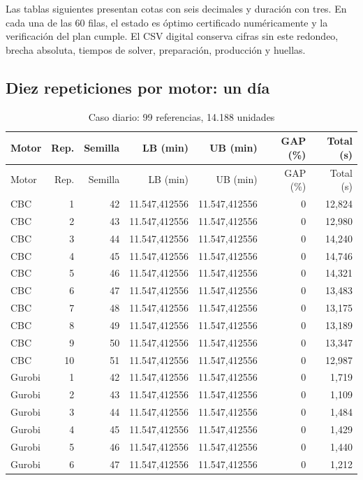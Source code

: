\documentclass[12pt,a4paper,oneside]{article}
\begin{document}
Las tablas siguientes presentan cotas con seis decimales y duración con tres. En cada una de las 60 filas, el estado es óptimo certificado numéricamente y la verificación del plan cumple. El CSV digital conserva cifras sin este redondeo, brecha absoluta, tiempos de solver, preparación, producción y huellas.

\clearpage
\subsection{Diez repeticiones por motor: un día}
{\small\setlength{\tabcolsep}{4pt}
\begin{longtable}{lrrrrrr}
\caption{Caso diario: 99 referencias, 14.188 unidades}\label{tab:60a}\\
\toprule Motor&Rep.&Semilla&LB (min)&UB (min)&GAP (\%)&Total (s)\\\midrule\endfirsthead
\toprule Motor&Rep.&Semilla&LB (min)&UB (min)&GAP (\%)&Total (s)\\\midrule\endhead
\bottomrule\endfoot
CBC & 1 & 42 & 11.547,412556 & 11.547,412556 & 0 & 12,824 \\
CBC & 2 & 43 & 11.547,412556 & 11.547,412556 & 0 & 12,980 \\
CBC & 3 & 44 & 11.547,412556 & 11.547,412556 & 0 & 14,240 \\
CBC & 4 & 45 & 11.547,412556 & 11.547,412556 & 0 & 14,746 \\
CBC & 5 & 46 & 11.547,412556 & 11.547,412556 & 0 & 14,321 \\
CBC & 6 & 47 & 11.547,412556 & 11.547,412556 & 0 & 13,483 \\
CBC & 7 & 48 & 11.547,412556 & 11.547,412556 & 0 & 13,175 \\
CBC & 8 & 49 & 11.547,412556 & 11.547,412556 & 0 & 13,189 \\
CBC & 9 & 50 & 11.547,412556 & 11.547,412556 & 0 & 13,347 \\
CBC & 10 & 51 & 11.547,412556 & 11.547,412556 & 0 & 12,987 \\
Gurobi & 1 & 42 & 11.547,412556 & 11.547,412556 & 0 & 1,719 \\
Gurobi & 2 & 43 & 11.547,412556 & 11.547,412556 & 0 & 1,109 \\
Gurobi & 3 & 44 & 11.547,412556 & 11.547,412556 & 0 & 1,484 \\
Gurobi & 4 & 45 & 11.547,412556 & 11.547,412556 & 0 & 1,429 \\
Gurobi & 5 & 46 & 11.547,412556 & 11.547,412556 & 0 & 1,440 \\
Gurobi & 6 & 47 & 11.547,412556 & 11.547,412556 & 0 & 1,212 \\

\end{longtable}}
\end{document}

